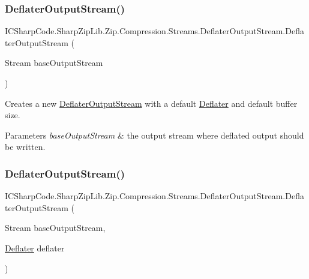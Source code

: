 \subsubsection{\texorpdfstring{Deflater\+Output\+Stream()}{DeflaterOutputStream()}\hspace{0.1cm}{\footnotesize\ttfamily [4/6]}}
{\footnotesize\ttfamily I\+C\+Sharp\+Code.\+Sharp\+Zip\+Lib.\+Zip.\+Compression.\+Streams.\+Deflater\+Output\+Stream.\+Deflater\+Output\+Stream (\begin{DoxyParamCaption}\item[{Stream}]{base\+Output\+Stream }\end{DoxyParamCaption})\hspace{0.3cm}{\ttfamily [inline]}}



Creates a new \hyperlink{class_i_c_sharp_code_1_1_sharp_zip_lib_1_1_zip_1_1_compression_1_1_streams_1_1_deflater_output_stream}{Deflater\+Output\+Stream} with a default \hyperlink{class_i_c_sharp_code_1_1_sharp_zip_lib_1_1_zip_1_1_compression_1_1_deflater}{Deflater} and default buffer size. 


\begin{DoxyParams}{Parameters}
{\em base\+Output\+Stream} & the output stream where deflated output should be written. \\
\hline
\end{DoxyParams}
\mbox{\label{class_i_c_sharp_code_1_1_sharp_zip_lib_1_1_zip_1_1_compression_1_1_streams_1_1_deflater_output_stream_a2715b711ea6e8cb17a58898d0571f2f2}} 
\subsubsection{\texorpdfstring{Deflater\+Output\+Stream()}{DeflaterOutputStream()}\hspace{0.1cm}{\footnotesize\ttfamily [5/6]}}
{\footnotesize\ttfamily I\+C\+Sharp\+Code.\+Sharp\+Zip\+Lib.\+Zip.\+Compression.\+Streams.\+Deflater\+Output\+Stream.\+Deflater\+Output\+Stream (\begin{DoxyParamCaption}\item[{Stream}]{base\+Output\+Stream,  }\item[{\hyperlink{class_i_c_sharp_code_1_1_sharp_zip_lib_1_1_zip_1_1_compression_1_1_deflater}{Deflater}}]{deflater }\end{DoxyParamCaption})\hspace{0.3cm}{\ttfamily [inline]}}



